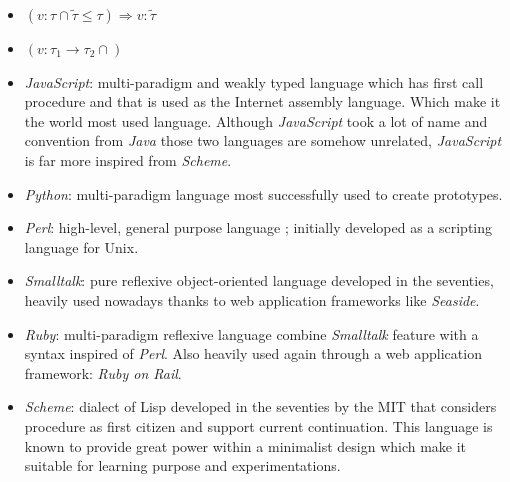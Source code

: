 \documentclass[a4paper]{report}
\begin{document}
\begin{itemize}
\item $(v:\tau\cap \tilde\tau\leq \tau)\Rightarrow v:\tilde \tau$
\item $(v:\tau_1\to\tau_2 \cap)$
\end{itemize}





\begin{itemize}
\item \emph{JavaScript}: multi-paradigm and weakly typed language which has first call procedure and that is used as the Internet assembly language. Which make it the world most used language. Although \emph{JavaScript} took a lot of name and convention from \emph{Java} those two languages are somehow unrelated, \emph{JavaScript} is far more inspired from \emph{Scheme}. 
\item \emph{Python}: multi-paradigm language most successfully used to create prototypes.
\item \emph{Perl}: high-level, general purpose language ; initially developed as a scripting language for Unix.
\item \emph{Smalltalk}: pure reflexive object-oriented language developed in the seventies, heavily used nowadays thanks to web application frameworks like \emph{Seaside}.
\item \emph{Ruby}: multi-paradigm reflexive language combine \emph{Smalltalk} feature with a syntax inspired of \emph{Perl}. Also heavily used again through a web application framework: \emph{Ruby on Rail}.
\item \emph{Scheme}: dialect of Lisp developed in the seventies by the MIT that considers procedure as first citizen and support current continuation. This language is known to provide great power within a minimalist design which make it suitable for learning purpose and experimentations.
\end{itemize}
\end{document}

